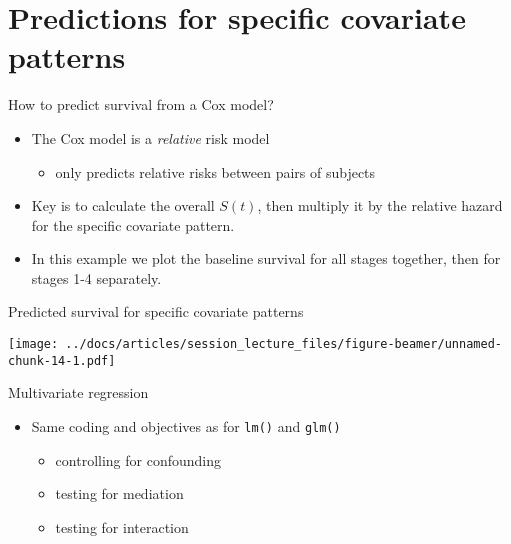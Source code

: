\documentclass[
  ignorenonframetext,
]{beamer}
\providecommand{\tightlist}{%
  \setlength{\itemsep}{0pt}\setlength{\parskip}{0pt}}
\begin{document}
\hypertarget{predictions-for-specific-covariate-patterns}{%
\section{Predictions for specific covariate
patterns}\label{predictions-for-specific-covariate-patterns}}

\begin{frame}{How to predict survival from a Cox model?}
\protect\hypertarget{how-to-predict-survival-from-a-cox-model}{}

\begin{itemize}
\tightlist
\item
  The Cox model is a \emph{relative} risk model

  \begin{itemize}
  \tightlist
  \item
    only predicts relative risks between pairs of subjects
  \end{itemize}
\item
  Key is to calculate the overall \(S(t)\), then multiply it by the
  relative hazard for the specific covariate pattern.
\item
  In this example we plot the baseline survival for all stages together,
  then for stages 1-4 separately.
\end{itemize}

\end{frame}

\begin{frame}{Predicted survival for specific covariate patterns}
\protect\hypertarget{predicted-survival-for-specific-covariate-patterns}{}

\texttt{[image: ../docs/articles/session\_lecture\_files/figure-beamer/unnamed-chunk-14-1.pdf]}

\end{frame}

\begin{frame}[fragile]{Multivariate regression}
\protect\hypertarget{multivariate-regression}{}

\begin{itemize}
\tightlist
\item
  Same coding and objectives as for \texttt{lm()} and \texttt{glm()}

  \begin{itemize}
  \tightlist
  \item
    controlling for confounding
  \item
    testing for mediation
  \item
    testing for interaction
  \end{itemize}
\end{itemize}

\end{frame}
\end{document}
